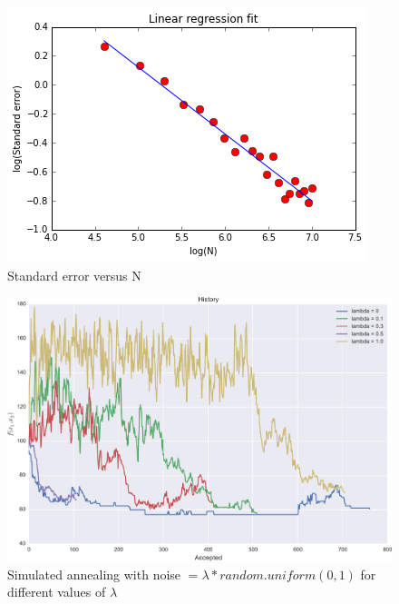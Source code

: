\documentclass[11pt]{scrartcl} %
\begin{document}
\begin{figure}
\centering
\includegraphics[width=10 cm]{LinearR}
\caption{Standard error versus N}
\label{fig:LR}
\end{figure}
	 
\begin{figure}
\centering
\includegraphics[width=10 cm]{lambda01}
\caption{Simulated annealing with noise $= \lambda*random.uniform(0,1)$ for different values of $\lambda$}
\label{fig:SA}
\end{figure}
	 
\end{document}
